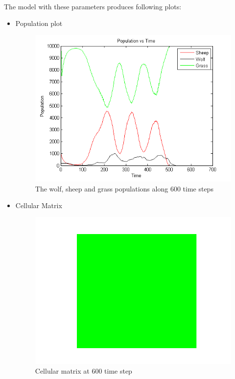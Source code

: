 \documentclass[prl,12pt,citeautoscript,reprint]{revtex4-1}
\begin{document}
The model with these parameters produces following plots:
\begin{itemize}
\item Population plot
\begin{figure}[H]
\centering
\includegraphics[width = 0.8\columnwidth]{3a} 

\caption{The wolf, sheep and grass populations along 600 time steps}\label{Fig:Population vs time}
\end{figure}
\item Cellular Matrix 
\begin{figure}[H]
\centering
\includegraphics[width =0.8\columnwidth]{3b} 
 
\caption{Cellular matrix at 600 time step}\label{Fig:Cellular matrix at 600 time step}
\end{figure}


\end{itemize}
\end{document}
